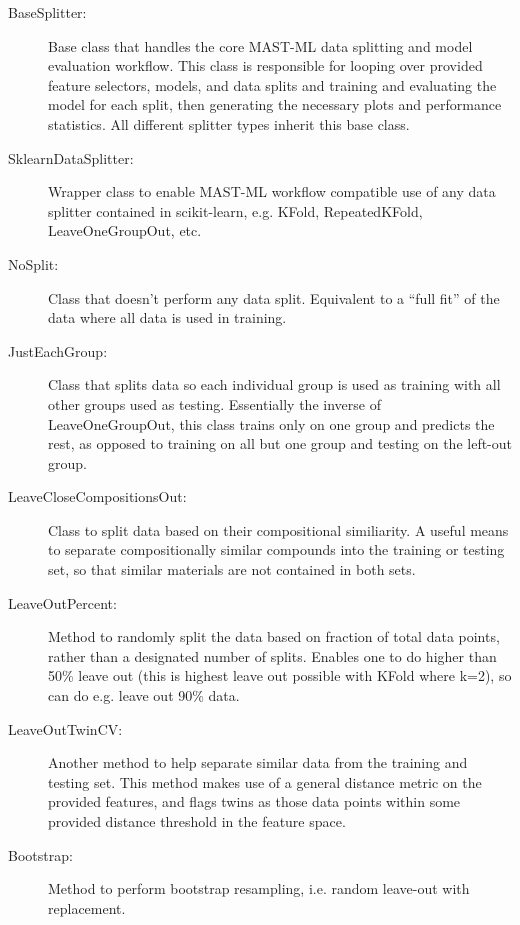 \documentclass[letterpaper,10pt,english]{sphinxmanual}
\begin{document}
\begin{description}
\item[{BaseSplitter:}] \leavevmode
Base class that handles the core MAST-ML data splitting and model evaluation workflow. This class is responsible
for looping over provided feature selectors, models, and data splits and training and evaluating the model for each
split, then generating the necessary plots and performance statistics. All different splitter types inherit this
base class.

\item[{SklearnDataSplitter:}] \leavevmode
Wrapper class to enable MAST-ML workflow compatible use of any data splitter contained in scikit-learn, e.g. KFold,
RepeatedKFold, LeaveOneGroupOut, etc.

\item[{NoSplit:}] \leavevmode
Class that doesn’t perform any data split. Equivalent to a “full fit” of the data where all data is used in training.

\item[{JustEachGroup:}] \leavevmode
Class that splits data so each individual group is used as training with all other groups used as testing. Essentially
the inverse of LeaveOneGroupOut, this class trains only on one group and predicts the rest, as opposed to training
on all but one group and testing on the left-out group.

\item[{LeaveCloseCompositionsOut:}] \leavevmode
Class to split data based on their compositional similiarity. A useful means to separate compositionally similar
compounds into the training or testing set, so that similar materials are not contained in both sets.

\item[{LeaveOutPercent:}] \leavevmode
Method to randomly split the data based on fraction of total data points, rather than a designated number of splits.
Enables one to do higher than 50\% leave out (this is highest leave out possible with KFold where k=2), so can do e.g.
leave out 90\% data.

\item[{LeaveOutTwinCV:}] \leavevmode
Another method to help separate similar data from the training and testing set. This method makes use of a general
distance metric on the provided features, and flags twins as those data points within some provided distance threshold
in the feature space.

\item[{Bootstrap:}] \leavevmode
Method to perform bootstrap resampling, i.e. random leave-out with replacement.

\end{description}
\end{document}
